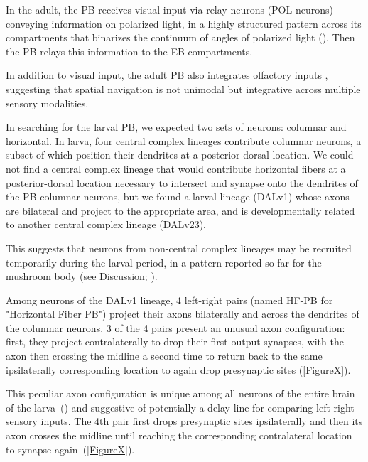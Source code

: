 \documentclass{article}
\begin{document}
In the adult, the PB receives visual input via relay neurons (POL neurons) conveying information on polarized light, in a highly structured pattern across its compartments that binarizes the continuum of angles of polarized light (\citep{heinze2009transformation}). Then the PB relays this information to the EB compartments.

In addition to visual input, the adult PB also integrates olfactory inputs \citep{hulse2021connectome}, suggesting that spatial navigation is not unimodal but integrative across multiple sensory modalities.

In searching for the larval PB, we expected two sets of neurons: columnar and horizontal. In larva, four central complex lineages contribute columnar neurons, a subset of which position their dendrites at a posterior-dorsal location. We could not find a central complex lineage that would contribute horizontal fibers at a posterior-dorsal location necessary to intersect and synapse onto the dendrites of the PB columnar neurons, but we found a larval lineage (DALv1) whose axons are bilateral and project to the appropriate area, and is developmentally related to another central complex lineage (DALv23).

This suggests that neurons from non-central complex lineages may be recruited temporarily during the larval period, in a pattern reported so far for the mushroom body (see Discussion; \citep{truman2023metamorphosis}). 




Among neurons of the DALv1 lineage, 4 left-right pairs (named HF-PB for "Horizontal Fiber PB") project their axons bilaterally and across the dendrites of the columnar neurons.
3 of the 4 pairs present an unusual axon configuration: first, they project contralaterally to drop their first output synapses, with the axon then crossing the midline a second time to return back to the same ipsilaterally corresponding location to again drop presynaptic sites (\ref{FigureX}).

This peculiar axon configuration is unique among all neurons of the entire brain of the larva~(\citep{winding2023}) and suggestive of potentially a delay line for comparing left-right sensory inputs.
The 4th pair first drops presynaptic sites ipsilaterally and then its axon crosses the midline until reaching the corresponding contralateral location to synapse again~(\ref{FigureX}).
\end{document}
